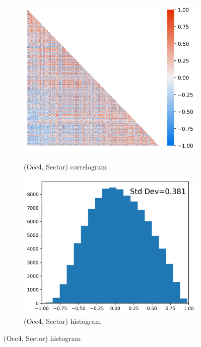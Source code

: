 \documentclass[12pt]{article}
\theoremstyle{definition}
\theoremstyle{plain}
\begin{document}
\begin{figure}[!htbp]
\begin{subfigure}[b]{\w\textwidth}
		\label{fig:correlograms_hist_iota_gamma_sorted}
	\end{subfigure}\vfill
	\begin{subfigure}[b]{\w\textwidth}
		\centering
		\caption{(Occ4, Sector) correlogram}
		\includegraphics[height=.25\textheight]{../Results/correlograms_occ4_first_recode_sector_IBGE_sorted}
		\label{fig:correlograms_occ4_first_recode_sector_IBGE_sorted}
	\end{subfigure}\hfill
	\begin{subfigure}[b]{\w\textwidth}
		\centering
		\caption{(Occ4, Sector) histogram}
		\includegraphics[height=.25\textheight]{../Results/correlograms_hist_occ4_first_recode_sector_IBGE_sorted}

\end{subfigure}
\end{figure}
\end{document}
